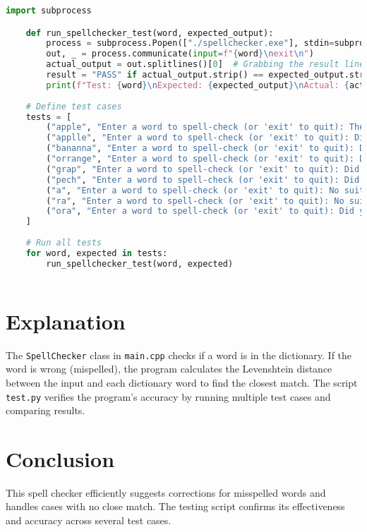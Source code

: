 \documentclass{article}
\begin{document}
\begin{lstlisting}[language=Python, caption={test.py}, label={lst:test}]
    import subprocess

    def run_spellchecker_test(word, expected_output):
        process = subprocess.Popen(["./spellchecker.exe"], stdin=subprocess.PIPE, stdout=subprocess.PIPE, text=True)
        out, _ = process.communicate(input=f"{word}\nexit\n")
        actual_output = out.splitlines()[0]  # Grabbing the result line after input prompt
        result = "PASS" if actual_output.strip() == expected_output.strip() else "FAIL"
        print(f"Test: {word}\nExpected: {expected_output}\nActual: {actual_output}\nResult: {result}\n")
    
    # Define test cases
    tests = [
        ("apple", "Enter a word to spell-check (or 'exit' to quit): The word 'apple' is spelled correctly."),
        ("applle", "Enter a word to spell-check (or 'exit' to quit): Did you mean: apple?"),
        ("bananna", "Enter a word to spell-check (or 'exit' to quit): Did you mean: banana?"),
        ("orrange", "Enter a word to spell-check (or 'exit' to quit): Did you mean: orange?"),
        ("grap", "Enter a word to spell-check (or 'exit' to quit): Did you mean: grape?"),
        ("pech", "Enter a word to spell-check (or 'exit' to quit): Did you mean: peach?"),
        ("a", "Enter a word to spell-check (or 'exit' to quit): No suitable suggestion found."),
        ("ra", "Enter a word to spell-check (or 'exit' to quit): No suitable suggestion found."),
        ("ora", "Enter a word to spell-check (or 'exit' to quit): Did you mean: orange?"),
    ]
    
    # Run all tests
    for word, expected in tests:
        run_spellchecker_test(word, expected)
    
\end{lstlisting}

\section*{Explanation}
The \texttt{SpellChecker} class in \texttt{main.cpp} checks if a word is in the dictionary. If the word is wrong (mispelled), the program calculates the Levenshtein distance between the input and each dictionary word to find the closest match. The script \texttt{test.py} verifies the program's accuracy by running multiple test cases and comparing results.

\section*{Conclusion}
This spell checker efficiently suggests corrections for misspelled words and handles cases with no close match. The testing script confirms its effectiveness and accuracy across several test cases.
\end{document}
